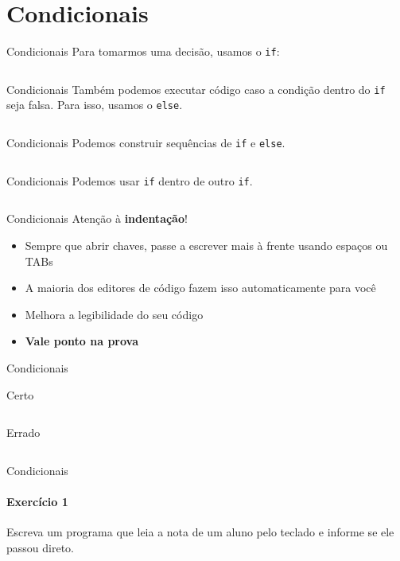 \documentclass{beamer}
\begin{document}
\section{Condicionais}
\begin{frame}{Condicionais}
	Para tomarmos uma decisão, usamos o \alert{\texttt{if}}:
	\inputminted{c}{resources/if.c}
\end{frame}
\begin{frame}{Condicionais}
	Também podemos executar código caso a condição dentro do \texttt{if} seja falsa. Para isso, usamos o \alert{\texttt{else}}.
	\inputminted[fontsize=\footnotesize]{c}{resources/else.c}
\end{frame}
\begin{frame}{Condicionais}
	Podemos construir sequências de \texttt{if} e \texttt{else}.
	\inputminted[fontsize=\footnotesize]{c}{resources/ifsequence.c}
\end{frame}
\begin{frame}{Condicionais}
	Podemos usar \texttt{if} dentro de outro \texttt{if}.
	\inputminted[fontsize=\footnotesize]{c}{resources/ifnested.c}
\end{frame}
\begin{frame}{Condicionais}
	Atenção à \textbf{indentação}!
	\begin{itemize}
		\item Sempre que abrir chaves, passe a escrever mais à frente usando espaços ou TABs
		\item A maioria dos editores de código fazem isso automaticamente para você
		\item Melhora a legibilidade do seu código
		\item \textbf{Vale ponto na prova}
	\end{itemize}
\end{frame}
\begin{frame}{Condicionais}
	\begin{exampleblock}{Certo}
		\inputminted[fontsize=\footnotesize]{c}{resources/identation.c}
	\end{exampleblock}
	\begin{exampleblock}{Errado}
		\inputminted[fontsize=\footnotesize]{c}{resources/identationwrong.c}
	\end{exampleblock}
\end{frame}
\begin{frame}{Condicionais}
	\framesubtitle{Exercício 1}
	Escreva um programa que leia a nota de um aluno pelo teclado e informe se ele passou direto.
\end{frame}
\end{document}
